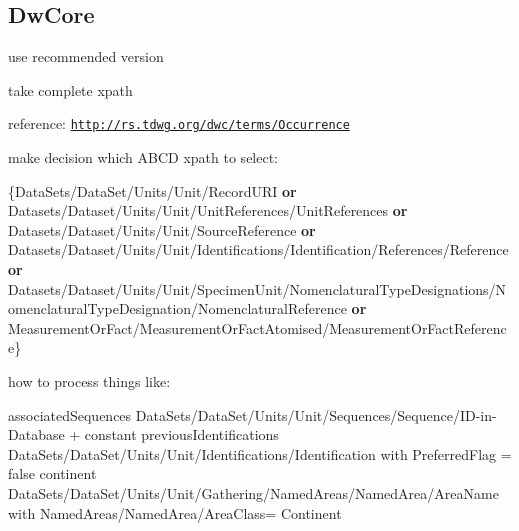 \subsection*{Dw\+Core}


\begin{DoxyItemize}
\item use recommended version
\item take complete xpath
\item reference\+: \href{http://rs.tdwg.org/dwc/terms/Occurrence}{\tt http\+://rs.\+tdwg.\+org/dwc/terms/\+Occurrence}
\item make decision which A\+B\+CD xpath to select\+:

\{Data\+Sets/\+Data\+Set/\+Units/\+Unit/\+Record\+U\+RI {\bfseries or} Datasets/\+Dataset/\+Units/\+Unit/\+Unit\+References/\+Unit\+References {\bfseries or} Datasets/\+Dataset/\+Units/\+Unit/\+Source\+Reference {\bfseries or} Datasets/\+Dataset/\+Units/\+Unit/\+Identifications/\+Identification/\+References/\+Reference {\bfseries or} Datasets/\+Dataset/\+Units/\+Unit/\+Specimen\+Unit/\+Nomenclatural\+Type\+Designations/\+Nomenclatural\+Type\+Designation/\+Nomenclatural\+Reference {\bfseries or} Measurement\+Or\+Fact/\+Measurement\+Or\+Fact\+Atomised/\+Measurement\+Or\+Fact\+Reference\}
\item how to process things like\+:

associated\+Sequences Data\+Sets/\+Data\+Set/\+Units/\+Unit/\+Sequences/\+Sequence/\+I\+D-\/in-\/\+Database + constant previous\+Identifications Data\+Sets/\+Data\+Set/\+Units/\+Unit/\+Identifications/\+Identification with Preferred\+Flag = false continent Data\+Sets/\+Data\+Set/\+Units/\+Unit/\+Gathering/\+Named\+Areas/\+Named\+Area/\+Area\+Name with Named\+Areas/\+Named\+Area/\+Area\+Class= Continent 
\end{DoxyItemize}